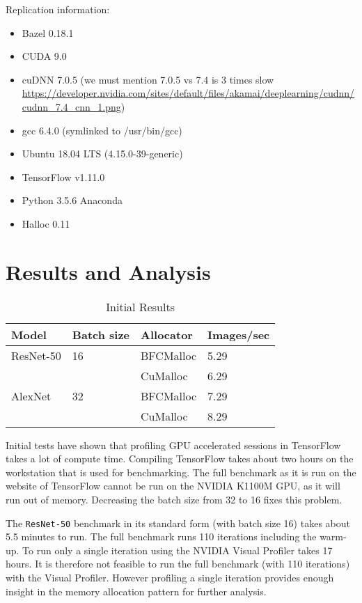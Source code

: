 \documentclass[12pt,twoside]{article}
\newcommand{\resnettimebfc}{5.29}
\newcommand{\resnettimecuda}{6.29}
\newcommand{\alexnettimebfc}{7.29}
\newcommand{\alexnettimecuda}{8.29}
\begin{document}
Replication information:
\begin{itemize}
    \item Bazel 0.18.1
    \item CUDA 9.0
    \item cuDNN 7.0.5 (we must mention 7.0.5 vs 7.4 is 3 times slow \url{https://developer.nvidia.com/sites/default/files/akamai/deeplearning/cudnn/cudnn_7.4_cnn_1.png})
    \item gcc 6.4.0 (symlinked to /usr/bin/gcc)
    \item Ubuntu 18.04 LTS (4.15.0-39-generic)
    \item TensorFlow v1.11.0
    \item Python 3.5.6 Anaconda
    \item Halloc 0.11
\end{itemize}




\section{Results and Analysis}
\label{sec:results-and-analysis}

\begin{table}[!ht]
\centering
\caption{Initial Results}
\label{tab:results}
\begin{tabular}{|l|l|l|l|}
\hline
Model     & Batch size & Allocator & Images/sec         \\ \hline
ResNet-50 & 16         & BFCMalloc & \resnettimebfc     \\ \cline{3-4} 
          &            & CuMalloc  & \resnettimecuda    \\ \hline
AlexNet   & 32         & BFCMalloc & \alexnettimebfc    \\ \cline{3-4} 
          &            & CuMalloc  & \alexnettimecuda   \\ \hline
\end{tabular}
\end{table}

Initial tests have shown that profiling GPU accelerated sessions in TensorFlow takes a lot of compute time. Compiling TensorFlow takes about two hours on the workstation that is used for benchmarking. The full benchmark as it is run on the website of TensorFlow cannot be run on the NVIDIA K1100M GPU, as it will run out of memory. Decreasing the batch size from 32 to 16 fixes this problem.

The \texttt{ResNet-50} benchmark in its standard form (with batch size 16) takes about 5.5 minutes to run. The full benchmark runs 110 iterations including the warm-up. To run only a single iteration using the NVIDIA Visual Profiler takes 17 hours. It is therefore not feasible to run the full benchmark (with 110 iterations) with the Visual Profiler. However profiling a single iteration provides enough insight in the memory allocation pattern for further analysis.
\end{document}
